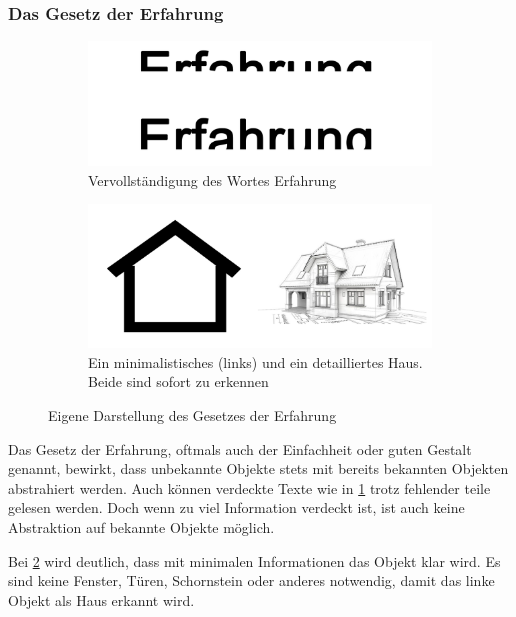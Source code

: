 \subsubsection{Das Gesetz der Erfahrung}
\begin{figure}[ht]
\begin{subfigure}{.5\linewidth}
  \centering
  \includegraphics[width=.95\linewidth]{img/gErfahrung}  
  \caption{Vervollständigung des Wortes \glqq Erfahrung\grqq}
  \label{fig:erfahrung1}
\end{subfigure}
\begin{subfigure}{.5\linewidth}
  \centering
  \includegraphics[width=.95\linewidth]{img/gErfahrung2}  
  \caption{Ein minimalistisches (links) und ein detailliertes Haus. Beide sind sofort zu erkennen}
  \label{fig:erfahrung2}
\end{subfigure}
\caption[Gesetz der Erfahrung]{Eigene Darstellung des Gesetzes der Erfahrung}
\label{fig:erfahrung}
\end{figure}
Das Gesetz der Erfahrung, oftmals auch der Einfachheit oder guten Gestalt genannt, bewirkt, dass unbekannte Objekte stets mit bereits bekannten Objekten abstrahiert werden.
Auch können verdeckte Texte wie in \ref{fig:erfahrung1} trotz fehlender teile gelesen werden.
Doch wenn zu viel Information verdeckt ist, ist auch keine Abstraktion auf bekannte Objekte möglich.

Bei \ref{fig:erfahrung2} wird deutlich, dass mit minimalen Informationen das Objekt klar wird.
Es sind keine Fenster, Türen, Schornstein oder anderes notwendig, damit das linke Objekt als Haus erkannt wird.

